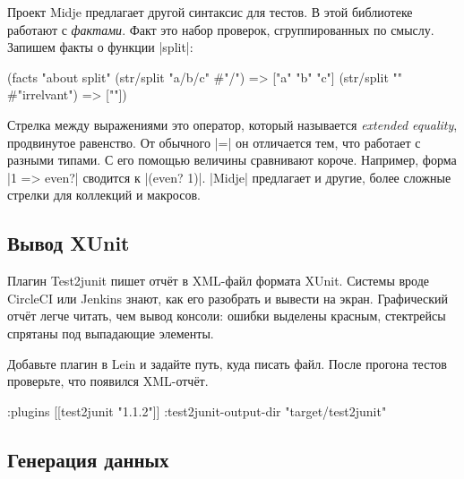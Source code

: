 
Проект Midje предлагает другой
синтаксис для тестов. В этой библиотеке работают с \emph{фактами}. Факт это
набор проверок, сгруппированных по смыслу. Запишем факты о функции
\spverb|split|:

\begin{english}
  \begin{clojure}
(facts "about split"
 (str/split "a/b/c" #"/") => ["a" "b" "c"]
 (str/split "" #"irrelvant") => [""])
  \end{clojure}
\end{english}


Стрелка между выражениями это оператор, который называется \emph{extended equality},
продвинутое равенство. От обычного \spverb|=| он отличается тем, что работает
с разными типами. С его помощью величины сравнивают короче. Например, форма
\spverb|1 => even?| сводится к \spverb|(even? 1)|. \spverb|Midje| предлагает
и другие, более сложные стрелки для коллекций и макросов.

\subsection{Вывод XUnit}


Плагин Test2junit пишет отчёт
в XML-файл формата XUnit. Системы вроде CircleCI или Jenkins знают, как его
разобрать и вывести на экран. Графический отчёт легче читать, чем вывод консоли:
ошибки выделены красным, стектрейсы спрятаны под выпадающие элементы.

Добавьте плагин в Lein и задайте путь, куда писать файл. После прогона тестов
проверьте, что появился XML-отчёт.

\begin{english}
  \begin{clojure}
:plugins [[test2junit "1.1.2"]]
:test2junit-output-dir "target/test2junit"
  \end{clojure}
\end{english}

\subsection{Генерация данных}

